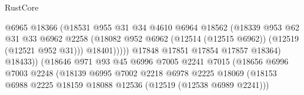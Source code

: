 \begin{lexlean}{RustCore}
\begin{coremodule}
                                            @6965
                                            @18366
                                            (@18531
                                              @955
                                              @31
                                              @34
                                              @4610
                                              @6964
                                              @18562
                                              (@18339
                                                @953
                                                @62
                                                @31
                                                @33
                                                @6962
                                                @2258
                                                (@18082
                                                  @952
                                                  @6962
                                                  (@12514 (@12515 @6962))
                                                  (@12519 (@12521 @952 @31)))
                                                @18401)))))
                                      @17848
                                      @17851
                                      @17854
                                      @17857
                                      @18364)
                                    @18433))
                                (@18646
                                  @971
                                  @93
                                  @45
                                  @6996
                                  @7005
                                  @2241
                                  @7015
                                  (@18656
                                    @6996
                                    @7003
                                    @2248
                                    (@18139
                                      @6995
                                      @7002
                                      @2218
                                      @6978
                                      @2225
                                      @18069
                                      (@18153
                                        @6988
                                        @2225
                                        @18159
                                        @18088
                                        @12536
                                        (@12519 (@12538 @6989 @2241)))

\end{coremodule}
\end{lexlean}
